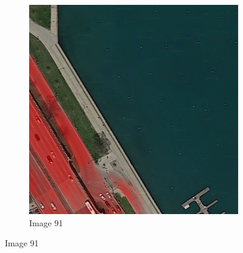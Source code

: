 \documentclass[10pt,conference,compsocconf]{IEEEtran}
\begin{document}
\begin{figure}
\begin{subfigure}[b]{0.3\columnwidth}
    \end{subfigure}
    \begin{subfigure}[b]{0.3\columnwidth}
    \caption*{Image 91}
        \includegraphics[width=\textwidth]{figures/training_hard/eval_overlays_pred_004.png}
    \end{subfigure}


\end{figure}
\end{document}
